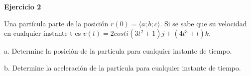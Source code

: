 \documentclass{article}
\begin{document}
\larger[2] 

\textbf{Ejercicio 2}\par

Una partícula parte de la posición $ r(0) =  \langle a; b; c\rangle$. Si se sabe que su velocidad en cualquier instante t es $ v(t) = 2 cos t i (3t^2 + 1)j + (4t^3 + t)k$. \par
a. Determine la posición de la partícula para cualquier instante de tiempo. \par
b. Determine la aceleración de la partícula para cualquier instante de tiempo. \par
\end{document}
